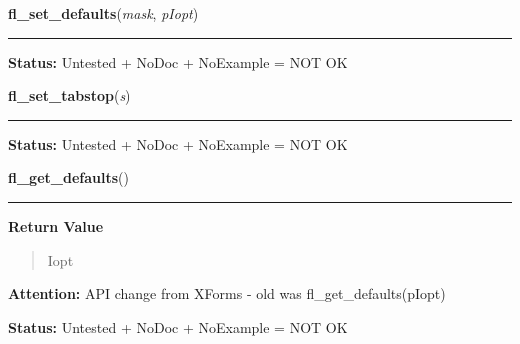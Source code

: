     \vspace{0.5ex}

\hspace{.8\funcindent}\begin{boxedminipage}{\funcwidth}

    \raggedright \textbf{fl\_set\_defaults}(\textit{mask}, \textit{pIopt})

    \vspace{-1.5ex}

    \rule{\textwidth}{0.5\fboxrule}
\setlength{\parskip}{2ex}
\setlength{\parskip}{1ex}
\textbf{Status:} Untested + NoDoc + NoExample = NOT OK



    \end{boxedminipage}

    \label{xformslib:library:fl_set_tabstop}

    \vspace{0.5ex}

\hspace{.8\funcindent}\begin{boxedminipage}{\funcwidth}

    \raggedright \textbf{fl\_set\_tabstop}(\textit{s})

    \vspace{-1.5ex}

    \rule{\textwidth}{0.5\fboxrule}
\setlength{\parskip}{2ex}
\setlength{\parskip}{1ex}
\textbf{Status:} Untested + NoDoc + NoExample = NOT OK



    \end{boxedminipage}

    \label{xformslib:library:fl_get_defaults}

    \vspace{0.5ex}

\hspace{.8\funcindent}\begin{boxedminipage}{\funcwidth}

    \raggedright \textbf{fl\_get\_defaults}()

    \vspace{-1.5ex}

    \rule{\textwidth}{0.5\fboxrule}
\setlength{\parskip}{2ex}
\setlength{\parskip}{1ex}
      \textbf{Return Value}
    \vspace{-1ex}

      \begin{quote}
      Iopt

      \end{quote}

\textbf{Attention:} API change from XForms - old was fl\_get\_defaults(pIopt)



\textbf{Status:} Untested + NoDoc + NoExample = NOT OK



    \end{boxedminipage}

